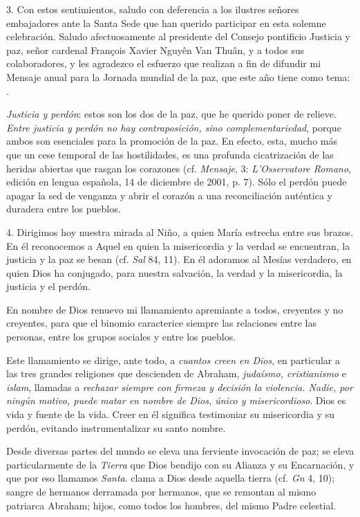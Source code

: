 \begin{body}
	3. Con estos sentimientos, saludo con deferencia a los ilustres señores embajadores ante la Santa Sede que han querido participar en esta solemne celebración. Saludo afectuosamente al presidente del Consejo pontificio Justicia y paz, señor cardenal François Xavier Nguyên Van Thuân, y a todos sus colaboradores, y les agradezco el esfuerzo que realizan a fin de difundir mi Mensaje anual para la Jornada mundial de la paz, que este año tiene como tema: .
	
	\emph{Justicia y perdón}: estos son los dos  de la paz, que he querido poner de relieve. \emph{Entre justicia y perdón no hay contraposición, sino complementariedad}, porque ambos son esenciales para la promoción de la paz. En efecto, esta, mucho más que un cese temporal de las hostilidades, es una profunda cicatrización de las heridas abiertas que rasgan los corazones (cf. \emph{Mensaje}, 3: \emph{L'Osservatore Romano,} edición en lengua española, 14 de diciembre de 2001, p. 7). Sólo el perdón puede apagar la sed de venganza y abrir el corazón a una reconciliación auténtica y duradera entre los pueblos.
	
	4. Dirigimos hoy nuestra mirada al Niño, a quien María estrecha entre sus brazos. En él reconocemos a Aquel en quien la misericordia y la verdad se encuentran, la justicia y la paz se besan (cf. \emph{Sal} 84, 11). En él adoramos al Mesías verdadero, en quien Dios ha conjugado, para nuestra salvación, la verdad y la misericordia, la justicia y el perdón.
	
	En nombre de Dios renuevo mi llamamiento apremiante a todos, creyentes y no creyentes, para que el binomio  caracterice siempre las relaciones entre las personas, entre los grupos sociales y entre los pueblos.
	
	Este llamamiento se dirige, ante todo, a \emph{cuantos creen en Dios}, en particular a las tres grandes religiones que descienden de Abraham, \emph{judaísmo, cristianismo} e \emph{islam}, llamadas a \emph{rechazar siempre con firmeza y decisión la violencia. Nadie, por ningún motivo, puede matar en nombre de Dios, único y misericordioso}. Dios es vida y fuente de la vida. Creer en él significa testimoniar su misericordia y su perdón, evitando instrumentalizar su santo nombre.
	
	Desde diversas partes del mundo se eleva una ferviente invocación de paz; se eleva particularmente de la \emph{Tierra} que Dios bendijo con su Alianza y su Encarnación, y que por eso llamamos \emph{Santa}.  clama a Dios desde aquella tierra (cf. \emph{Gn} 4, 10); sangre de hermanos derramada por hermanos, que se remontan al mismo patriarca Abraham; hijos, como todos los hombres, del mismo Padre celestial.
	

\end{body}
